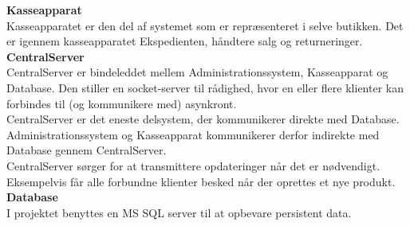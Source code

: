 \textbf{Kasseapparat}\\
Kasseapparatet er den del af systemet som er repræsenteret i selve butikken. Det er igennem kasseapparatet Ekspedienten, håndtere salg og returneringer. \\

\textbf{CentralServer}\\
CentralServer er bindeleddet mellem Administrationssystem, Kasseapparat og Database. Den stiller en socket-server til rådighed, hvor en eller flere klienter kan forbindes til (og kommunikere med) asynkront.\\

CentralServer er det eneste delsystem, der kommunikerer direkte med Database. Administrationssystem og Kasseapparat kommunikerer derfor indirekte med Database gennem CentralServer.\\

CentralServer sørger for at transmittere opdateringer når det er nødvendigt. Eksempelvis får alle forbundne klienter besked når der oprettes et nye produkt.\\

\textbf{Database}\\
I projektet benyttes en MS SQL server til at opbevare persistent data.
